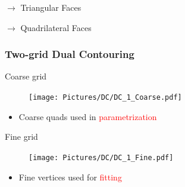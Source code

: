 \begin{frame}
\pause
\pause
\pause
\pause
\pause
\pause
\pause
\pause
\vspace{-.1cm}
\begin{minipage}[c]{0.5\linewidth}
\begin{center}$\rightarrow$ Triangular Faces\end{center}
\end{minipage}%
\hfill%
\begin{minipage}[c]{0.5\linewidth}
\begin{center}
	{$\rightarrow$ Quadrilateral Faces}
\end{center}
\end{minipage}
\end{frame}


\begin{frame}
\frametitle{Two-grid Dual Contouring}
\begin{overlayarea}{\textwidth}{0.9\textheight}
	\begin{minipage}{0.45\textwidth}
	\begin{block}{\centering Coarse grid}
	\vspace{-0.5cm}
	\begin{figure}
	\texttt{[image: Pictures/DC/DC\_1\_Coarse.pdf]}
	\end{figure}
	\begin{itemize}
	\item Coarse quads used in \textcolor{red}{parametrization}
	\end{itemize}
	\end{block}
	\end{minipage}
	\hfill%
	\begin{minipage}{0.45\textwidth}
	\vspace{-0.37cm}
	\begin{block}{\centering Fine grid}
	\vspace{-0.5cm}
	\begin{figure}
	\texttt{[image: Pictures/DC/DC\_1\_Fine.pdf]}
	\end{figure}
	\begin{itemize}
	\item Fine vertices used for \textcolor{red}{fitting}
	\end{itemize}
	\end{block}
	\end{minipage}
\end{overlayarea}
\end{frame}



